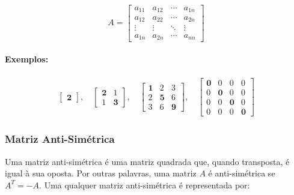 \[
    A = \begin{bmatrix}
        a_{11} & a_{12} & \cdots & a_{1n} \\
        a_{12} & a_{22} & \cdots & a_{2n} \\
        \vdots & \vdots & \ddots & \vdots \\
        a_{1n} & a_{2n} & \cdots & a_{nn}
    \end{bmatrix}
\]

\paragraph{Exemplos:}

\[
    \begin{matrix}
        \begin{bmatrix}
            \mathbf{2}
        \end{bmatrix},
        \quad
        \begin{bmatrix}
            \mathbf{2} & 1          \\
            1          & \mathbf{3}
        \end{bmatrix},
        \quad
        \begin{bmatrix}
            \mathbf{1} & 2          & 3          \\
            2          & \mathbf{5} & 6          \\
            3          & 6          & \mathbf{9}
        \end{bmatrix},
        \quad
        \begin{bmatrix}
            \mathbf{0} & 0          & 0          & 0          \\
            0          & \mathbf{0} & 0          & 0          \\
            0          & 0          & \mathbf{0} & 0          \\
            0          & 0          & 0          & \mathbf{0}
        \end{bmatrix}
    \end{matrix}
\]

\subsubsection{Matriz Anti-Simétrica}
\indent

Uma matriz anti-simétrica é uma matriz quadrada que, quando transposta, é igual à sua oposta. Por outras palavras, uma matriz $A$ é anti-simétrica se $A^T = -A$. Uma qualquer matriz anti-simétrica é representada por:

